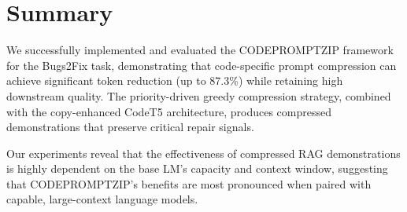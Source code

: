\documentclass[11pt,a4paper]{article}
\begin{document}
\section*{Summary}

We successfully implemented and evaluated the CODEPROMPTZIP framework for the Bugs2Fix task, demonstrating that code-specific prompt compression can achieve significant token reduction (up to 87.3\%) while retaining high downstream quality. The priority-driven greedy compression strategy, combined with the copy-enhanced CodeT5 architecture, produces compressed demonstrations that preserve critical repair signals.

Our experiments reveal that the effectiveness of compressed RAG demonstrations is highly dependent on the base LM's capacity and context window, suggesting that CODEPROMPTZIP's benefits are most pronounced when paired with capable, large-context language models.

\end{document}
